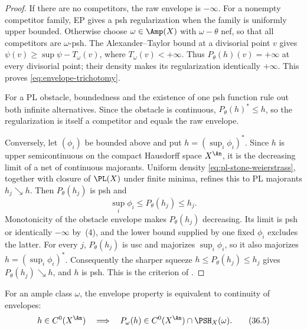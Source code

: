 \begin{proof}
If there are no competitors, the raw envelope is $-\infty$. For a
nonempty competitor family, EP gives a psh regularization when the family
is uniformly upper bounded. Otherwise choose $\omega\in\Amp(X)$ with
$\omega-\theta$ nef, so that all competitors are $\omega$-psh. The
Alexander--Taylor bound at a divisorial point $v$ gives
$\psi(v)\geq\sup\psi-T_\omega(v)$, where $T_\omega(v)<+\infty$.
Thus $P_\theta(h)(v)=+\infty$ at every divisorial point; their density
makes its regularization identically $+\infty$. This proves
\eqref{eq:envelope-trichotomy}.

For a PL obstacle, boundedness and the existence of one psh function rule out
both infinite alternatives.  Since the obstacle is continuous,
$P_\theta(h)^*\leq h$, so the regularization is itself a competitor and
equals the raw envelope.

Conversely, let $(\phi_i)$ be bounded above and put
$h=(\sup_i\phi_i)^*$.  Since $h$ is upper semicontinuous on the compact
Hausdorff space $X^{\An}$, it is the decreasing limit of a net of
continuous majorants.  Uniform density \eqref{eq:pl-stone-weierstrass},
together with closure of $\PL(X)$ under finite minima, refines this to PL
majorants $h_j\searrow h$.  Then $P_\theta(h_j)$ is psh and
\[
          \sup_i\phi_i\leq P_\theta(h_j)\leq h_j.
\]
Monotonicity of the obstacle envelope makes $P_\theta(h_j)$ decreasing.
Its limit is psh or identically $-\infty$ by
\,(4), and the lower bound supplied by one fixed
$\phi_i$ excludes the latter.  For every $j$, $P_\theta(h_j)$ is usc and majorizes $\sup_i\phi_i$,
so it also majorizes $h=(\sup_i\phi_i)^*$. Consequently the sharper
squeeze $h\leq P_\theta(h_j)\leq h_j$ gives
$P_\theta(h_j)\searrow h$, and $h$ is psh.
This is the criterion of \cite[Lemma~1.3]{BJ22b}.
\end{proof}

\begin{proposition}\label{prop:ch36-continuity-of-envelopes}
For an ample class $\omega$, the envelope property is equivalent to
continuity of envelopes:
\[
 h\in C^0(X^{\An})\quad\Longrightarrow\quad
                     P_\omega(h)\in C^0(X^{\An})\cap\PSH_X(\omega).
\tag{36.5}\label{eq:continuity-of-envelopes}
\]
\end{proposition}

